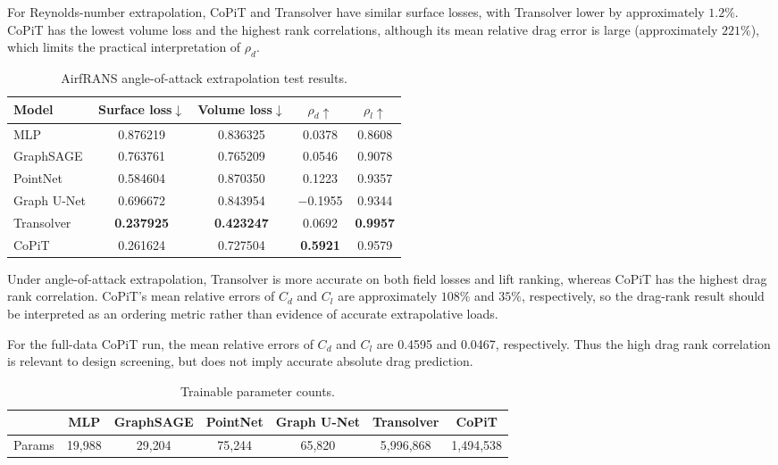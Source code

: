 \documentclass[final,3p,times]{elsarticle}
\begin{document}
For Reynolds-number extrapolation, CoPiT and Transolver have similar surface losses, with Transolver lower by approximately $1.2\%$. CoPiT has the lowest volume loss and the highest rank correlations, although its mean relative drag error is large (approximately $221\%$), which limits the practical interpretation of $\rho_d$.

\begin{table}[H]
\caption{AirfRANS angle-of-attack extrapolation test results.}
\label{tab:aoa}
\centering\footnotesize
\begin{tabular}{@{}lcccc@{}}
\toprule
Model & Surface loss$\downarrow$ & Volume loss$\downarrow$ & $\rho_d\uparrow$ & $\rho_l\uparrow$ \\
\midrule
MLP         & 0.876219 & 0.836325 & 0.0378 & 0.8608 \\
GraphSAGE   & 0.763761 & 0.765209 & 0.0546 & 0.9078 \\
PointNet    & 0.584604 & 0.870350 & 0.1223 & 0.9357 \\
Graph U-Net & 0.696672 & 0.843954 & $-$0.1955 & 0.9344 \\
Transolver  & \textbf{0.237925} & \textbf{0.423247} & 0.0692 & \textbf{0.9957} \\
CoPiT       & 0.261624 & 0.727504 & \textbf{0.5921} & 0.9579 \\
\bottomrule
\end{tabular}
\end{table}

Under angle-of-attack extrapolation, Transolver is more accurate on both field losses and lift ranking, whereas CoPiT has the highest drag rank correlation. CoPiT's mean relative errors of $C_d$ and $C_l$ are approximately $108\%$ and $35\%$, respectively, so the drag-rank result should be interpreted as an ordering metric rather than evidence of accurate extrapolative loads.

For the full-data CoPiT run, the mean relative errors of $C_d$ and $C_l$ are 0.4595 and 0.0467, respectively. Thus the high drag rank correlation is relevant to design screening, but does not imply accurate absolute drag prediction.

\begin{table}[H]
\caption{Trainable parameter counts.}
\label{tab:params}
\centering\footnotesize
\begin{tabular}{@{}lcccccc@{}}
\toprule
 & MLP & GraphSAGE & PointNet & Graph U-Net & Transolver & CoPiT \\
\midrule
Params & 19{,}988 & 29{,}204 & 75{,}244 & 65{,}820 & 5{,}996{,}868 & 1{,}494{,}538 \\
\bottomrule
\end{tabular}
\end{table}
\end{document}
